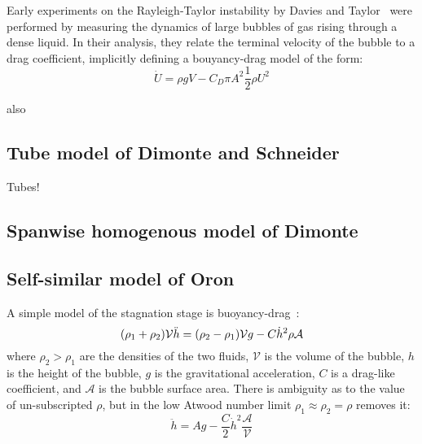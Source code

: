 Early experiments on the Rayleigh-Taylor instability by Davies and Taylor~\cite{Davies1950a} were performed by measuring the dynamics of large bubbles of gas rising through a dense liquid.
In their analysis, they relate the terminal velocity of the bubble to a drag coefficient, implicitly defining a bouyancy-drag model of the form:
\begin{equation}
\dot{U} = \rho g V - C_D \pi A^2 \frac{1}{2} \rho U^2
\end{equation}

also \cite{Alon1995}

\subsection{Tube model of Dimonte and Schneider}

Tubes! \cite{Dimonte1996}

\subsection{Spanwise homogenous model of Dimonte}

\cite{Dimonte2000a}

\subsection{Self-similar model of Oron}

A simple model of the stagnation stage is buoyancy-drag~\cite{Oron2001}:
\begin{equation} \elabel{buoyancy_drag}
(\rho_1 + \rho_2) \mathcal{V} \ddot{h} = (\rho_2 - \rho_1) \mathcal{V} g - C \dot{h}^2 \rho \mathcal{A}
\end{equation}
where $\rho_2 > \rho_1$ are the densities of the two fluids, 
$\mathcal{V}$ is the volume of the bubble, 
$h$ is the height of the bubble,
$g$ is the gravitational acceleration,
$C$ is a drag-like coefficient, and
$\mathcal{A}$ is the bubble surface area.
There is ambiguity as to the value of un-subscripted $\rho$, but in the low Atwood number limit $\rho_1 \approx \rho_2 = \rho$ removes it:
\begin{equation}
\ddot{h} = A g - \frac{C}{2} \dot{h}^2 \frac{\mathcal{A}}{\mathcal{V}}
\end{equation}


